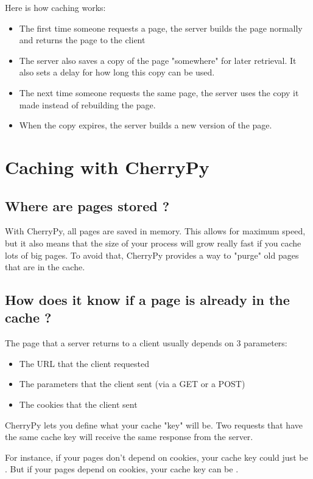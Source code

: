 \documentclass{manual}
\begin{document}
Here is how caching works:
\begin{itemize}
\item
The first time someone requests a page, the server builds the page normally and returns the page to the client
\item
The server also saves a copy of the page "somewhere" for later retrieval. It also sets a delay for how long this copy
can be used.
\item
The next time someone requests the same page, the server uses the copy it made instead of rebuilding the page.
\item
When the copy expires, the server builds a new version of the page.
\end{itemize}

\section{Caching with CherryPy}
\subsection{Where are pages stored ?}
With CherryPy, all pages are saved in memory. This allows for maximum speed, but it also means that the size of
your process will grow really fast if you cache lots of big pages. To avoid that, CherryPy provides a way
to "purge" old pages that are in the cache.

\subsection{How does it know if a page is already in the cache ?}
The page that a server returns to a client usually depends on 3 parameters:
\begin{itemize}
\item
The URL that the client requested
\item
The parameters that the client sent (via a GET or a POST)
\item
The cookies that the client sent
\end{itemize}
CherryPy lets you define what your cache "key" will be. Two requests that have the same cache key will receive the
same response from the server.

For instance, if your pages don't depend on cookies, your cache key could just be .
But if your pages depend on cookies, your cache key can be .
\end{document}

